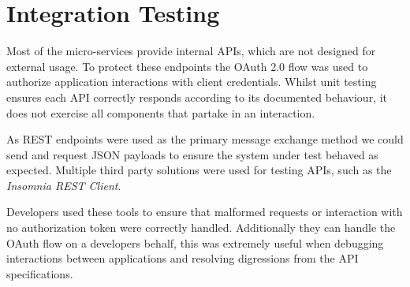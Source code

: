 \section{Integration Testing}
\par
Most of the micro-services provide internal APIs, which are not designed for external usage. To protect these endpoints the OAuth 2.0 flow was used to authorize application interactions with client credentials. Whilst unit testing ensures each API correctly responds according to its documented behaviour, it does not exercise all components that partake in an interaction.

\par
As REST endpoints were used as the primary message exchange method we could send and request JSON payloads to ensure the system under test behaved as expected. Multiple third party solutions were used for testing APIs, such as the \textit{Insomnia REST Client}. 

\par
Developers used these tools to ensure that malformed requests or interaction with no authorization token were correctly handled. Additionally they can handle the OAuth flow on a developers behalf, this was extremely useful when debugging interactions between applications and resolving digressions from the API specifications.

\par
